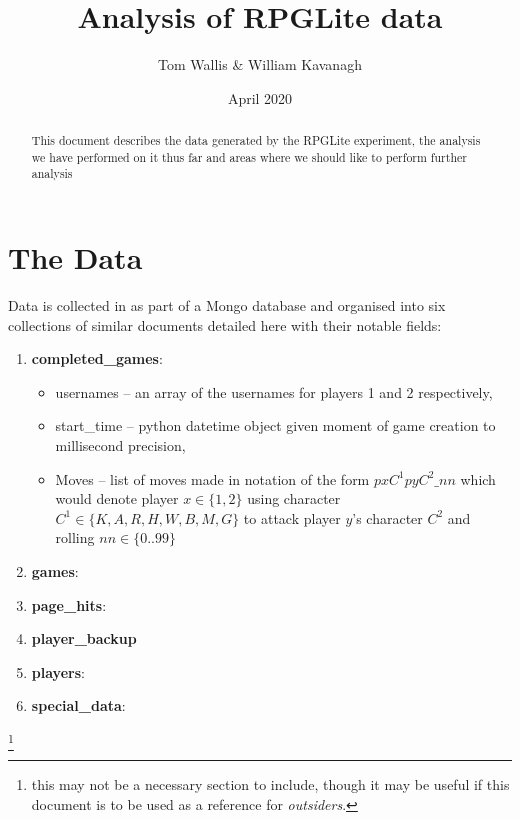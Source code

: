 \documentclass{tufte-handout}
\title{Analysis of RPGLite data}
\author[]{Tom Wallis \& William Kavanagh}
\date{April 2020}  %
\begin{document}
\maketitle%

\begin{abstract}
\noindent This document describes the data generated by the RPGLite experiment, the analysis we have performed on it thus far and areas where we should like to perform further analysis
\end{abstract}


\section{The Data}

Data is collected in as part of a Mongo database and organised into six collections of similar documents detailed here with their notable fields:
\begin{enumerate}
    \item \textbf{completed\_games}: 
    \begin{itemize}
        \item usernames -- an array of the usernames for players 1 and 2 respectively,
        \item start\_time -- python datetime object given moment of game creation to millisecond precision,
        \item Moves -- list of moves made in notation of the form $pxC^1pyC^2\_nn$ which would denote player $x \in \{1,2\}$ using character $C^1 \in \{K,A,R,H,W,B,M,G\}$  to attack player $y$'s character $C^2$ and rolling $nn \in \{0..99\}$ 
    \end{itemize}
    \item \textbf{games}:
    \item \textbf{page\_hits}:
    \item \textbf{player\_backup}
    \item \textbf{players}:
    \item \textbf{special\_data}:
\end{enumerate}

\footnote{this may not be a necessary section to include, though it may be useful if this document is to be used as a reference for \textit{outsiders}.}

\newpage
\end{document}
